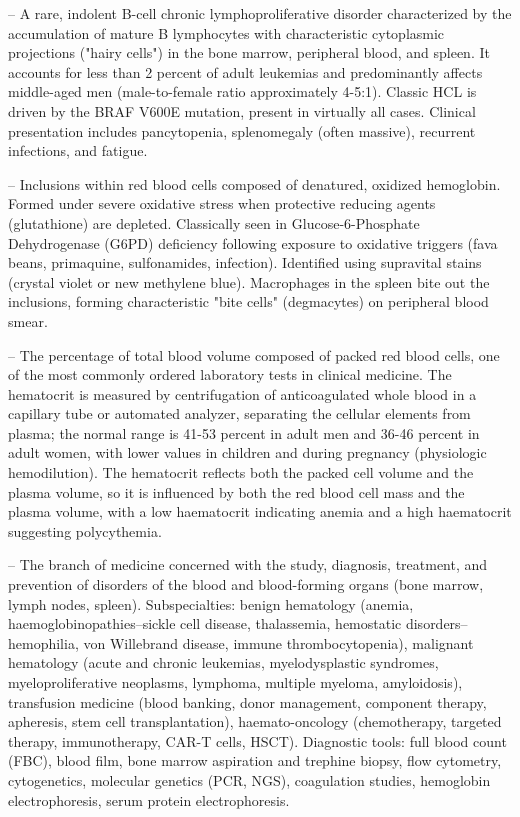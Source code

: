 -- A rare, indolent B-cell chronic lymphoproliferative disorder characterized by the accumulation of mature B lymphocytes with characteristic cytoplasmic projections ("hairy cells") in the bone marrow, peripheral blood, and spleen. It accounts for less than 2 percent of adult leukemias and predominantly affects middle-aged men (male-to-female ratio approximately 4-5:1). Classic HCL is driven by the BRAF V600E mutation, present in virtually all cases. Clinical presentation includes pancytopenia, splenomegaly (often massive), recurrent infections, and fatigue.

-- Inclusions within red blood cells composed of denatured, oxidized hemoglobin. Formed under severe oxidative stress when protective reducing agents (glutathione) are depleted. Classically seen in Glucose-6-Phosphate Dehydrogenase (G6PD) deficiency following exposure to oxidative triggers (fava beans, primaquine, sulfonamides, infection). Identified using supravital stains (crystal violet or new methylene blue). Macrophages in the spleen bite out the inclusions, forming characteristic "bite cells" (degmacytes) on peripheral blood smear.

-- The percentage of total blood volume composed of packed red blood cells, one of the most commonly ordered laboratory tests in clinical medicine. The hematocrit is measured by centrifugation of anticoagulated whole blood in a capillary tube or automated analyzer, separating the cellular elements from plasma; the normal range is 41-53 percent in adult men and 36-46 percent in adult women, with lower values in children and during pregnancy (physiologic hemodilution). The hematocrit reflects both the packed cell volume and the plasma volume, so it is influenced by both the red blood cell mass and the plasma volume, with a low haematocrit indicating anemia and a high haematocrit suggesting polycythemia.

-- The branch of medicine concerned with the study, diagnosis, treatment, and prevention of disorders of the blood and blood-forming organs (bone marrow, lymph nodes, spleen). Subspecialties: benign hematology (anemia, haemoglobinopathies--sickle cell disease, thalassemia, hemostatic disorders--hemophilia, von Willebrand disease, immune thrombocytopenia), malignant hematology (acute and chronic leukemias, myelodysplastic syndromes, myeloproliferative neoplasms, lymphoma, multiple myeloma, amyloidosis), transfusion medicine (blood banking, donor management, component therapy, apheresis, stem cell transplantation), haemato-oncology (chemotherapy, targeted therapy, immunotherapy, CAR-T cells, HSCT). Diagnostic tools: full blood count (FBC), blood film, bone marrow aspiration and trephine biopsy, flow cytometry, cytogenetics, molecular genetics (PCR, NGS), coagulation studies, hemoglobin electrophoresis, serum protein electrophoresis.

